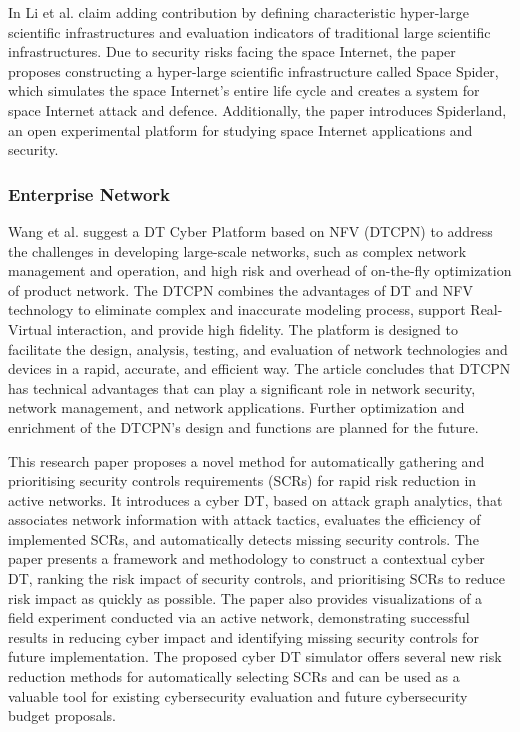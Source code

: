 In \cite{jiaqiliSpaceSpiderHyper2022} Li et al. claim adding contribution by defining characteristic hyper-large scientific infrastructures and evaluation indicators of traditional large scientific infrastructures. Due to security risks facing the space Internet, the paper proposes constructing a hyper-large scientific infrastructure called Space Spider, which simulates the space Internet's entire life cycle and creates a system for space Internet attack and defence. Additionally, the paper introduces Spiderland, an open experimental platform for studying space Internet applications and security.

\subsubsection{Enterprise Network}
 Wang et al.\cite{wangDTCPNDigitalTwin2022} suggest a DT Cyber Platform based on NFV (DTCPN) to address the challenges in developing large-scale networks, such as complex network management and operation, and high risk and overhead of on-the-fly optimization of product network. The DTCPN combines the advantages of DT and NFV technology to eliminate complex and inaccurate modeling process, support Real-Virtual interaction, and provide high fidelity. The platform is designed to facilitate the design, analysis, testing, and evaluation of network technologies and devices in a rapid, accurate, and efficient way. The article concludes that DTCPN has technical advantages that can play a significant role in network security, network management, and network applications. Further optimization and enrichment of the DTCPN's design and functions are planned for the future.

This\cite{hadarCyberDigitalTwin2020} research paper proposes a novel method for automatically gathering and prioritising security controls requirements (SCRs) for rapid risk reduction in active networks. It introduces a cyber DT, based on attack graph analytics, that associates network information with attack tactics, evaluates the efficiency of implemented SCRs, and automatically detects missing security controls. The paper presents a framework and methodology to construct a contextual cyber DT, ranking the risk impact of security controls, and prioritising SCRs to reduce risk impact as quickly as possible. The paper also provides visualizations of a field experiment conducted via an active network, demonstrating successful results in reducing cyber impact and identifying missing security controls for future implementation. The proposed cyber DT simulator offers several new risk reduction methods for automatically selecting SCRs and can be used as a valuable tool for existing cybersecurity evaluation and future cybersecurity budget proposals.

